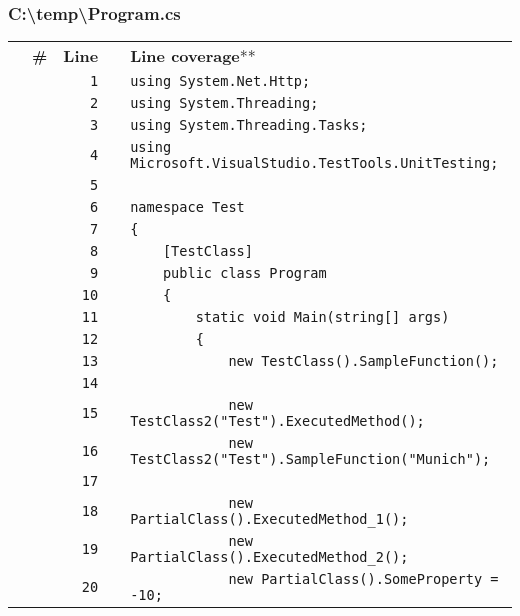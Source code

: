 \documentclass[a4paper,landscape,10pt]{article}
\begin{document}
\subsubsection{C:\textbackslash temp\textbackslash Program.cs}
\begin{longtable}[l]{lrrll}
 & \textbf{\#} & \textbf{Line} & & \textbf{Line coverage}** \\
\cellcolor{gray} &  & \verb~1~ & & \verb~using System.Net.Http;~\\
\cellcolor{gray} &  & \verb~2~ & & \verb~using System.Threading;~\\
\cellcolor{gray} &  & \verb~3~ & & \verb~using System.Threading.Tasks;~\\
\cellcolor{gray} &  & \verb~4~ & & \verb~using Microsoft.VisualStudio.TestTools.UnitTesting;~\\
\cellcolor{gray} &  & \verb~5~ & & \verb~~\\
\cellcolor{gray} &  & \verb~6~ & & \verb~namespace Test~\\
\cellcolor{gray} &  & \verb~7~ & & \verb~{~\\
\cellcolor{gray} &  & \verb~8~ & & \verb~    [TestClass]~\\
\cellcolor{gray} &  & \verb~9~ & & \verb~    public class Program~\\
\cellcolor{gray} &  & \verb~10~ & & \verb~    {~\\
\cellcolor{gray} &  & \verb~11~ & & \verb~        static void Main(string[] args)~\\
\cellcolor{gray} &  & \verb~12~ & & \verb~        {~\\
\cellcolor{gray} &  & \verb~13~ & & \verb~            new TestClass().SampleFunction();~\\
\cellcolor{gray} &  & \verb~14~ & & \verb~~\\
\cellcolor{gray} &  & \verb~15~ & & \verb~            new TestClass2("Test").ExecutedMethod();~\\
\cellcolor{gray} &  & \verb~16~ & & \verb~            new TestClass2("Test").SampleFunction("Munich");~\\
\cellcolor{gray} &  & \verb~17~ & & \verb~~\\
\cellcolor{gray} &  & \verb~18~ & & \verb~            new PartialClass().ExecutedMethod_1();~\\
\cellcolor{gray} &  & \verb~19~ & & \verb~            new PartialClass().ExecutedMethod_2();~\\
\cellcolor{gray} &  & \verb~20~ & & \verb~            new PartialClass().SomeProperty = -10;~\\

\end{longtable}
\end{document}
